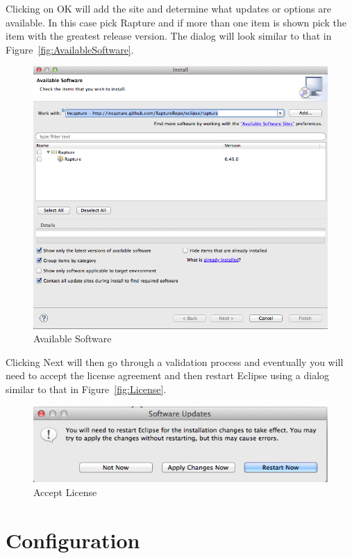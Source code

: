 Clicking on OK will add the site and determine what updates or options are available. In this case pick Rapture and if more than one item is shown pick the item with the greatest release version. The dialog will look similar to that in Figure~\vref{fig:AvailableSoftware}.

\begin{figure}[htb]
\centering
\includegraphics[scale=0.5]{images/AvailableSoftware.png}
\caption{Available Software}
\label{fig:AvailableSoftware}
\end{figure}

Clicking Next will then go through a validation process and eventually you will need to accept the license agreement and then restart Eclipse using a dialog similar to that in Figure~\vref{fig:License}.

\begin{figure}[htb]
\centering
\includegraphics[scale=0.5]{images/AcceptLicense.png}
\caption{Accept License}
\label{fig:License}
\end{figure}

\section{Configuration}

